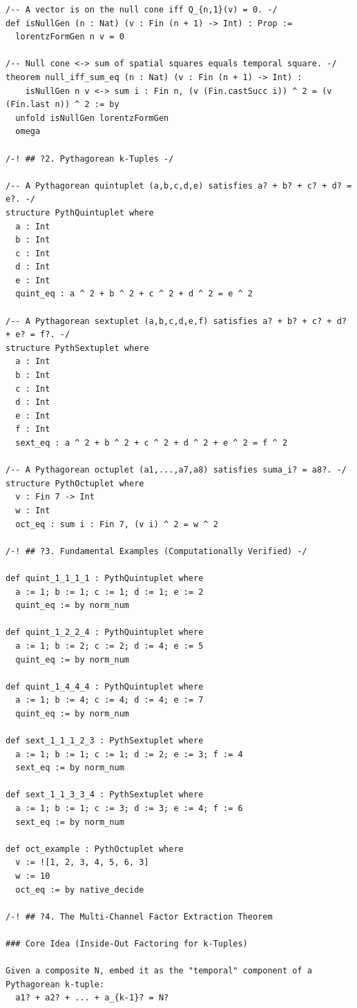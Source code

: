 \documentclass[11pt,twoside,openright]{book}
\theoremstyle{definition}
\theoremstyle{remark}
\begin{document}
\begin{lstlisting}[style=lean]
/-- A vector is on the null cone iff Q_{n,1}(v) = 0. -/
def isNullGen (n : Nat) (v : Fin (n + 1) -> Int) : Prop :=
  lorentzFormGen n v = 0

/-- Null cone <-> sum of spatial squares equals temporal square. -/
theorem null_iff_sum_eq (n : Nat) (v : Fin (n + 1) -> Int) :
    isNullGen n v <-> sum i : Fin n, (v (Fin.castSucc i)) ^ 2 = (v (Fin.last n)) ^ 2 := by
  unfold isNullGen lorentzFormGen
  omega

/-! ## ?2. Pythagorean k-Tuples -/

/-- A Pythagorean quintuplet (a,b,c,d,e) satisfies a? + b? + c? + d? = e?. -/
structure PythQuintuplet where
  a : Int
  b : Int
  c : Int
  d : Int
  e : Int
  quint_eq : a ^ 2 + b ^ 2 + c ^ 2 + d ^ 2 = e ^ 2

/-- A Pythagorean sextuplet (a,b,c,d,e,f) satisfies a? + b? + c? + d? + e? = f?. -/
structure PythSextuplet where
  a : Int
  b : Int
  c : Int
  d : Int
  e : Int
  f : Int
  sext_eq : a ^ 2 + b ^ 2 + c ^ 2 + d ^ 2 + e ^ 2 = f ^ 2

/-- A Pythagorean octuplet (a1,...,a7,a8) satisfies suma_i? = a8?. -/
structure PythOctuplet where
  v : Fin 7 -> Int
  w : Int
  oct_eq : sum i : Fin 7, (v i) ^ 2 = w ^ 2

/-! ## ?3. Fundamental Examples (Computationally Verified) -/

def quint_1_1_1_1 : PythQuintuplet where
  a := 1; b := 1; c := 1; d := 1; e := 2
  quint_eq := by norm_num

def quint_1_2_2_4 : PythQuintuplet where
  a := 1; b := 2; c := 2; d := 4; e := 5
  quint_eq := by norm_num

def quint_1_4_4_4 : PythQuintuplet where
  a := 1; b := 4; c := 4; d := 4; e := 7
  quint_eq := by norm_num

def sext_1_1_1_2_3 : PythSextuplet where
  a := 1; b := 1; c := 1; d := 2; e := 3; f := 4
  sext_eq := by norm_num

def sext_1_1_3_3_4 : PythSextuplet where
  a := 1; b := 1; c := 3; d := 3; e := 4; f := 6
  sext_eq := by norm_num

def oct_example : PythOctuplet where
  v := ![1, 2, 3, 4, 5, 6, 3]
  w := 10
  oct_eq := by native_decide

/-! ## ?4. The Multi-Channel Factor Extraction Theorem

### Core Idea (Inside-Out Factoring for k-Tuples)

Given a composite N, embed it as the "temporal" component of a Pythagorean k-tuple:
  a1? + a2? + ... + a_{k-1}? = N?


\end{lstlisting}
\end{document}
